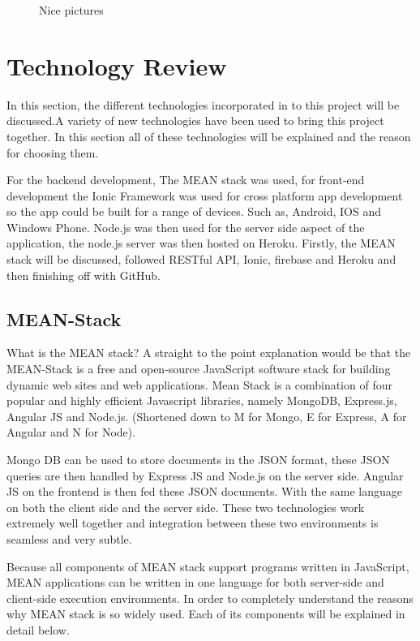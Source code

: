 \begin{figure}
  \centering
  \caption{Nice pictures}
  \label{tikz:graphs}
\end{figure}


\chapter{Technology Review}
In this section, the different technologies incorporated in to this project will be discussed.A variety of new technologies have been used to bring this project together. In this section all of these technologies will be explained and the reason for choosing them.

For the backend development, The MEAN stack was used, for front-end development the Ionic Framework was used for cross platform app development so the app could be built for a range of devices. Such as, Android, IOS and Windows Phone. Node.js was then used for the server side aspect of the application, the node.js server was then hosted on Heroku. Firstly, the MEAN stack will be discussed, followed RESTful API, Ionic, firebase and Heroku and then finishing off with GitHub. 

\section{MEAN-Stack}
What is the MEAN stack? A straight to the point explanation would be that the MEAN-Stack is a free and open-source JavaScript software stack for building dynamic web sites and web applications. Mean Stack is a combination of four popular and highly efficient Javascript libraries, namely MongoDB, Express.js, Angular JS and Node.js. (Shortened down to M for Mongo, E for Express, A for Angular and N for Node). 

Mongo DB can be used to store documents in the JSON format, these JSON queries are then handled by Express JS and Node.js on the server side. Angular JS on the frontend is then fed these JSON documents. With the same language on both the client side and the server side. These two technologies work extremely well together and integration between these two environments is seamless and very subtle.\cite{Mean-Stack}

Because all components of MEAN stack support programs written in JavaScript, MEAN applications can be written in one language for both server-side and client-side execution environments. In order to completely understand the reasons why MEAN stack is so widely used. Each of its components will be explained in detail below. 




